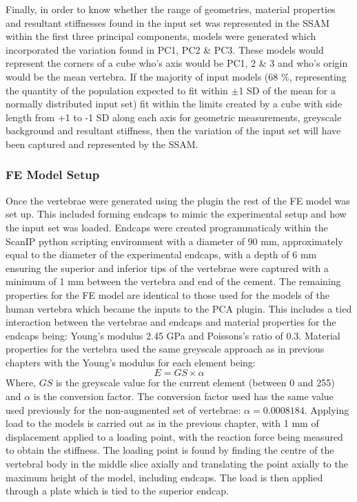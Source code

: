 Finally, in order to know whether the range of geometries, material properties and resultant stiffnesses found in the input set was represented in the SSAM within the first three principal components, models were generated which incorporated the variation found in PC1, PC2 \& PC3.
These models would represent the corners of a cube who's axis would be PC1, 2 \& 3 and who's origin would be the mean vertebra.
If the majority of input models (68 \%, representing the quantity of the population expected to fit within $\pm$1 SD of the mean for a normally distributed input set) fit within the limits created by a cube with side length from +1 to -1 SD along each axis for geometric measurements, greyscale background and resultant stiffness, then the variation of the input set will have been captured and represented by the SSAM.

\subsubsection{FE Model Setup}

Once the vertebrae were generated using the plugin the rest of the FE model was set up.
This included forming endcaps to mimic the experimental setup and how the input set was loaded.
Endcaps were created programmaticaly within the ScanIP python scripting environment with a diameter of 90 mm, approximately equal to the diameter of the experimental endcaps, with a depth of 6 mm ensuring the superior and inferior tips of the vertebrae were captured with a minimum of 1 mm between the vertebra and end of the cement.
The remaining properties for the FE model are identical to those used for the models of the human vertebra which became the inputs to the PCA plugin.
This includes a tied interaction between the vertebrae and endcaps and material properties for the endcaps being: Young's modulus 2.45 GPa and Poissons's ratio of 0.3.
Material properties for the vertebra used the same greyscale approach as in previous chapters with the Young's modulus for each element being:
\[ E = GS \times \alpha \]
Where, $GS$ is the greyscale value for the current element (between 0 and 255) and $\alpha$ is the conversion factor.
The conversion factor used has the same value used previously for the non-augmented set of vertebrae: $\alpha = 0.0008184$.
Applying load to the models is carried out as in the previous chapter, with 1 mm of displacement applied to a loading point, with the reaction force being measured to obtain the stiffness.
The loading point is found by finding the centre of the vertebral body in the middle slice axially and translating the point axially to the maximum height of the model, including endcaps.
The load is then applied through a plate which is tied to the superior endcap.

